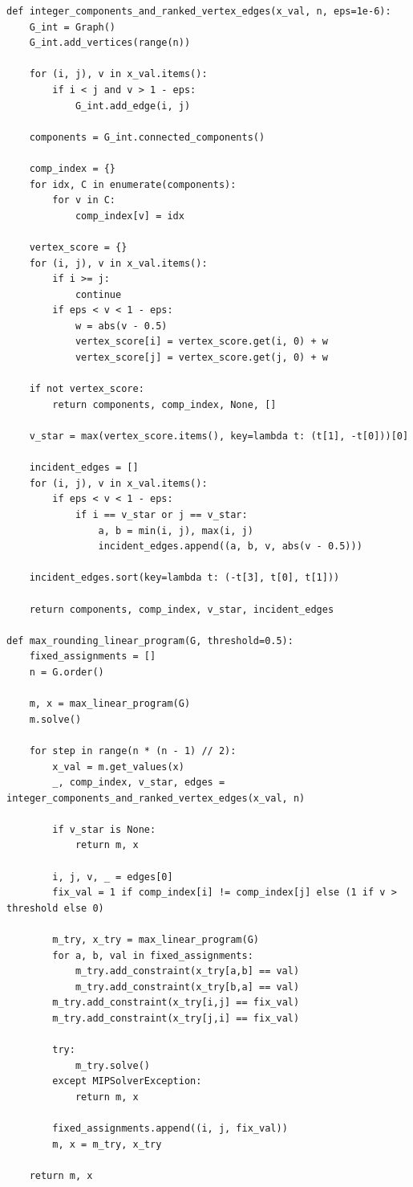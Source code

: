 \begin{lstlisting}[style=python, caption={Max Rounding Linear Program.}, label={lst::max_rounding_linear_program}]
def integer_components_and_ranked_vertex_edges(x_val, n, eps=1e-6):
    G_int = Graph()
    G_int.add_vertices(range(n))

    for (i, j), v in x_val.items():
        if i < j and v > 1 - eps:
            G_int.add_edge(i, j)

    components = G_int.connected_components()

    comp_index = {}
    for idx, C in enumerate(components):
        for v in C:
            comp_index[v] = idx

    vertex_score = {}
    for (i, j), v in x_val.items():
        if i >= j:
            continue
        if eps < v < 1 - eps:
            w = abs(v - 0.5)
            vertex_score[i] = vertex_score.get(i, 0) + w
            vertex_score[j] = vertex_score.get(j, 0) + w

    if not vertex_score:
        return components, comp_index, None, []

    v_star = max(vertex_score.items(), key=lambda t: (t[1], -t[0]))[0]

    incident_edges = []
    for (i, j), v in x_val.items():
        if eps < v < 1 - eps:
            if i == v_star or j == v_star:
                a, b = min(i, j), max(i, j)
                incident_edges.append((a, b, v, abs(v - 0.5)))

    incident_edges.sort(key=lambda t: (-t[3], t[0], t[1]))

    return components, comp_index, v_star, incident_edges

def max_rounding_linear_program(G, threshold=0.5):
    fixed_assignments = []
    n = G.order()

    m, x = max_linear_program(G)
    m.solve()

    for step in range(n * (n - 1) // 2):
        x_val = m.get_values(x)
        _, comp_index, v_star, edges = integer_components_and_ranked_vertex_edges(x_val, n)

        if v_star is None:
            return m, x

        i, j, v, _ = edges[0]
        fix_val = 1 if comp_index[i] != comp_index[j] else (1 if v > threshold else 0)

        m_try, x_try = max_linear_program(G)
        for a, b, val in fixed_assignments:
            m_try.add_constraint(x_try[a,b] == val)
            m_try.add_constraint(x_try[b,a] == val)
        m_try.add_constraint(x_try[i,j] == fix_val)
        m_try.add_constraint(x_try[j,i] == fix_val)

        try:
            m_try.solve()
        except MIPSolverException:
            return m, x

        fixed_assignments.append((i, j, fix_val))
        m, x = m_try, x_try

    return m, x
\end{lstlisting}

